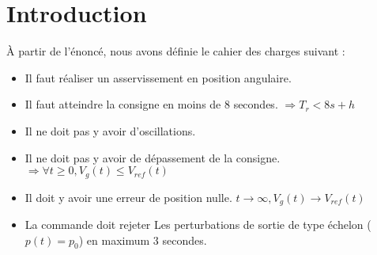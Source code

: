 \chapter*{Introduction}
\label{chap:Intro}

À partir de l'énoncé, nous avons définie le cahier des charges suivant :
\begin{itemize}
\item Il faut réaliser un asservissement en position angulaire.
\item Il faut atteindre la consigne en moins de 8 secondes. $\Rightarrow T_r<8s + h $
\item Il ne doit pas y avoir d'oscillations.
\item Il ne doit pas y avoir de dépassement de la consigne.$\Rightarrow \forall t \geq 0, V_g(t)\leq V_{ref}(t)$
\item Il doit y avoir une erreur de position nulle. $ t\rightarrow \infty, V_g(t) \rightarrow V_{ref}(t)$
\item La commande doit rejeter Les perturbations de sortie de type échelon ($p(t)=p_0$) en maximum 3 secondes.
\end{itemize}